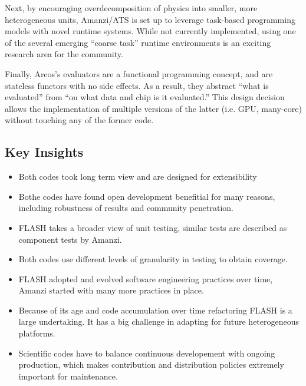 Next, by encouraging overdecomposition of physics into smaller, more
heterogeneous units, Amanzi/ATS is set up to leverage task-based
programming models with novel runtime systems.  While not currently
implemented, using one of the several emerging ``coarse task'' runtime
environments \cite{BauerTSA12,Qingyu,CharmPP} is an exciting research
area for the community.

Finally, Arcos's evaluators are a functional programming concept, and
are stateless functors with no side effects.  As a result, they
abstract ``what is evaluated'' from ``on what data and chip is it
evaluated.''  This design decision allows the implementation of
multiple versions of the latter (i.e. GPU, many-core) without touching
any of the former code.

\subsection*{Key Insights}
\label{caseStudies-insights}
\begin{itemize}
\item Both codes took long term view and are designed for
extensibility
\item Bothe codes have found open development benefitial for many
reasons, including robustness of results and community penetration.
\item FLASH takes a broader view of unit testing, similar tests are
described as component tests by Amanzi.
\item Both codes use different levels of granularity in testing to
obtain coverage.
\item FLASH adopted and evolved software engineering practices over
time, Amanzi started with many more practices in place.
\item Because of its age and code accumulation over time refactoring
FLASH is a large undertaking. It has a big challenge in adapting for
future heterogeneous platforms.
\item Scientific codes have to balance continuous developement with
ongoing production, which makes contribution and distribution policies
extremely important for maintenance.
\end{itemize}
